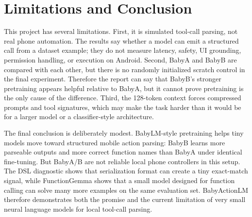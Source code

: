 \section{Limitations and Conclusion}

This project has several limitations. First, it is simulated tool-call parsing, not real phone automation. The results say whether a model can emit a structured call from a dataset example; they do not measure latency, safety, UI grounding, permission handling, or execution on Android. Second, BabyA and BabyB are compared with each other, but there is no randomly initialized scratch control in the final experiment. Therefore the report can say that BabyB's stronger pretraining appears helpful relative to BabyA, but it cannot prove pretraining is the only cause of the difference. Third, the 128-token context forces compressed prompts and tool signatures, which may make the task harder than it would be for a larger model or a classifier-style architecture.

The final conclusion is deliberately modest. BabyLM-style pretraining helps tiny models move toward structured mobile action parsing: BabyB learns more parseable outputs and more correct function names than BabyA under identical fine-tuning. But BabyA/B are not reliable local phone controllers in this setup. The DSL diagnostic shows that serialization format can create a tiny exact-match signal, while FunctionGemma shows that a small model designed for function calling can solve many more examples on the same evaluation set. BabyActionLM therefore demonstrates both the promise and the current limitation of very small neural language models for local tool-call parsing.
